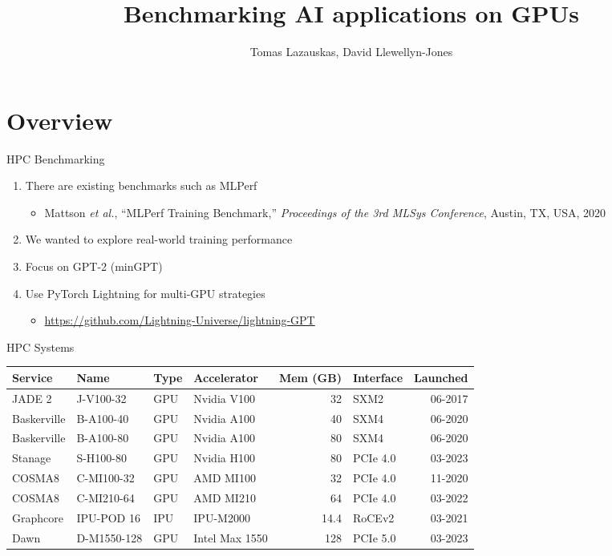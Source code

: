 \documentclass[t]{beamer}
\title{Benchmarking AI applications on GPUs}
\author{Tomas Lazauskas, David Llewellyn-Jones}
\newcommand{\faded}[1]{\textcolor{fadedcolor}{#1}}
\begin{document}
\begin{frame}
	\titlepage
\end{frame}

\section{Overview}

\begin{frame}{HPC Benchmarking}

\begin{enumerate}
  \item There are existing benchmarks such as MLPerf
  \begin{itemize}
    \item Mattson {\it et al.}, ``MLPerf Training Benchmark,'' {\it Proceedings of the 3rd MLSys Conference}, Austin, TX, USA, 2020
  \end{itemize}
  \item We wanted to explore real-world training performance
  \item Focus on GPT-2 (minGPT)
  \item Use PyTorch Lightning for multi-GPU strategies
  \begin{itemize}
      \item \url{https://github.com/Lightning-Universe/lightning-GPT}
  \end{itemize}
\end{enumerate}

\end{frame}

\begin{frame}{HPC Systems}
\fontsize{\blockbodysize}{\bodylineheightmultiplier\blockbodysize}\selectfont

\begin{center}
\begin{tabularx}{1.0\textwidth}{L L L L R L R}
  \hline
  Service & Name & Type & Accelerator & Mem (GB) & Interface & Launched \\ \hline
  JADE 2 & J-V100-32 & GPU & Nvidia V100 & 32 & SXM2 & 06-2017 \\
  Baskerville & B-A100-40 & GPU & Nvidia A100 & 40 & SXM4 & 06-2020 \\
  Baskerville & B-A100-80 & GPU & Nvidia A100 & 80 & SXM4 & 06-2020 \\
  Stanage & S-H100-80 & GPU & Nvidia H100 & 80 & PCIe 4.0 & 03-2023 \\
  COSMA8 & C-MI100-32 & GPU & AMD MI100 & 32 & PCIe 4.0 & 11-2020 \\
  COSMA8 & C-MI210-64 & GPU & AMD MI210 & 64 & PCIe 4.0 & 03-2022 \\
  Graphcore & IPU-POD 16 & IPU & IPU-M2000 & 14.4 & RoCEv2 & 03-2021 \\
  \faded{Dawn} & \faded{D-M1550-128} & \faded{GPU} & \faded{Intel Max 1550} & \faded{128} & \faded{PCIe 5.0} & \faded{03-2023} \\ \hline
\end{tabularx}
\end{center}

\end{frame}
\end{document}
